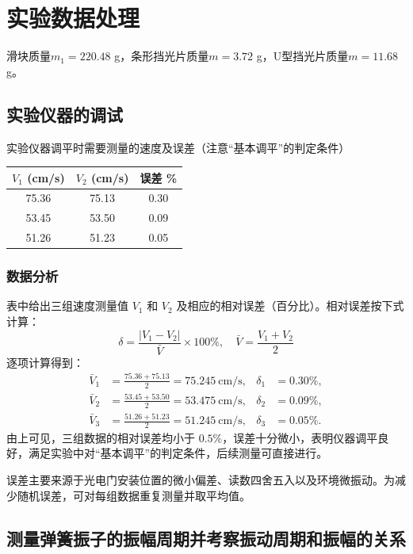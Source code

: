 \documentclass[11pt]{article}
\begin{document}
\section{实验数据处理}
滑块质量$m_{1}=220.48$ g，条形挡光片质量$m=3.72$ g，U型挡光片质量$m=11.68$ g。
\subsection{实验仪器的调试}

实验仪器调平时需要测量的速度及误差（注意“基本调平”的判定条件）

\begin{table}[h]
    \centering
    \begin{tabular}{ccc}
        \toprule
        $V_1$ (cm/s) & $V_2$ (cm/s) & 误差 \% \\
        \midrule
        75.36 & 75.13 & 0.30 \\
        53.45 & 53.50 & 0.09 \\
        51.26 & 51.23 & 0.05 \\
        \bottomrule
    \end{tabular}
\end{table}

\subsubsection{数据分析}
表中给出三组速度测量值 $V_1$ 和 $V_2$ 及相应的相对误差（百分比）。相对误差按下式计算：
\begin{equation}
\delta=\frac{|V_1-V_2|}{\bar V}\times100\%,\quad \bar V=\frac{V_1+V_2}{2}
\end{equation}
逐项计算得到：
\begin{align*}
\bar V_1&=\frac{75.36+75.13}{2}=75.245\ \mathrm{cm/s}, &\delta_1&=0.30\%,\\
\bar V_2&=\frac{53.45+53.50}{2}=53.475\ \mathrm{cm/s}, &\delta_2&=0.09\%,\\
\bar V_3&=\frac{51.26+51.23}{2}=51.245\ \mathrm{cm/s}, &\delta_3&=0.05\%.
\end{align*}
由上可见，三组数据的相对误差均小于 $0.5\%$，误差十分微小，表明仪器调平良好，满足实验中对“基本调平”的判定条件，后续测量可直接进行。

误差主要来源于光电门安装位置的微小偏差、读数四舍五入以及环境微振动。为减少随机误差，可对每组数据重复测量并取平均值。

\subsection{测量弹簧振子的振幅周期并考察振动周期和振幅的关系}
\end{document}
